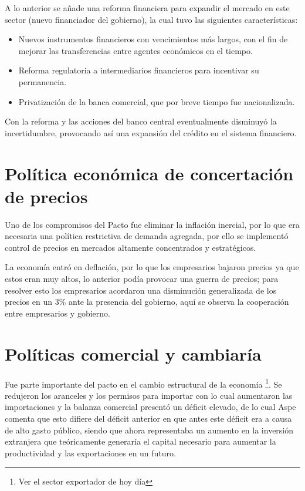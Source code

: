A lo anterior se añade una reforma financiera para expandir el mercado en este sector (nuevo financiador del gobierno), la cual tuvo las siguientes características:
\begin{itemize}
    \item Nuevos instrumentos financieros con vencimientos más largos, con el fin de mejorar las transferencias entre agentes económicos en el tiempo.
    \item Reforma regulatoria a intermediarios financieros para incentivar su permanencia.
    \item Privatización de la banca comercial, que por breve tiempo fue nacionalizada.
\end{itemize}
Con la reforma y las acciones del banco central eventualmente disminuyó la incertidumbre, provocando así una expansión del crédito en el sistema financiero.

\section{Política económica de concertación de precios}
Uno de los compromisos del Pacto fue eliminar la inflación inercial, por lo que era necesaria una política restrictiva de demanda agregada, por ello se implementó control de precios en mercados altamente concentrados y estratégicos.

La economía entró en deflación, por lo que los empresarios bajaron precios ya que estos eran muy altos, lo anterior podía provocar una guerra de precios; para resolver esto los empresarios acordaron una disminución generalizada de los precios en un 3\% ante la presencia del gobierno, aquí se observa la cooperación entre empresarios y gobierno.

\section{Políticas comercial y cambiaría}
Fue parte importante del pacto en el cambio estructural de la economía \footnote{Ver el sector exportador de hoy día}.
Se redujeron los aranceles y los permisos para importar con lo cual aumentaron las importaciones y la balanza comercial presentó un déficit elevado, de lo cual Aspe comenta que esto difiere del déficit anterior en que antes este déficit era a causa de alto gasto público, siendo que ahora representaba un aumento en la inversión extranjera que teóricamente generaría el capital necesario para aumentar la productividad y las exportaciones en un futuro.

